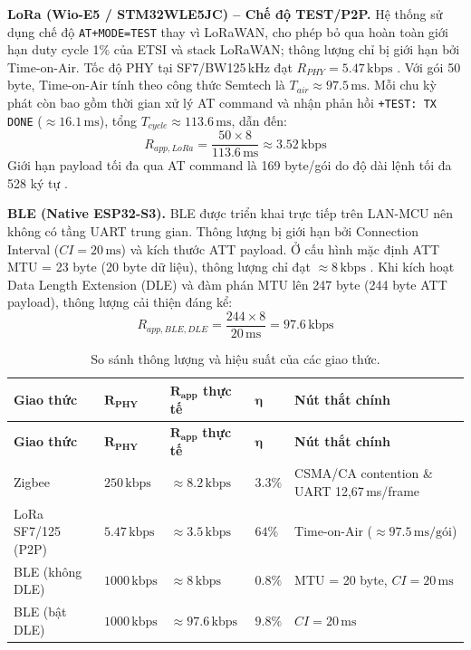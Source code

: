         \textbf{LoRa (Wio-E5 / STM32WLE5JC) -- Chế độ TEST/P2P.} Hệ thống sử dụng chế độ \texttt{AT+MODE=TEST} thay vì LoRaWAN, cho phép bỏ qua hoàn toàn giới hạn duty cycle 1\% của ETSI và stack LoRaWAN; thông lượng chỉ bị giới hạn bởi Time-on-Air. Tốc độ PHY tại SF7/BW125\,kHz đạt $R_{PHY} = 5{.}47\,\text{kbps}$ \cite{semtech_lora_design_guide}. Với gói 50 byte, Time-on-Air tính theo công thức Semtech là $T_{air} \approx 97{.}5\,\text{ms}$. Mỗi chu kỳ phát còn bao gồm thời gian xử lý AT command và nhận phản hồi \texttt{+TEST: TX DONE} ($\approx 16{.}1\,\text{ms}$), tổng $T_{cycle} \approx 113{.}6\,\text{ms}$, dẫn đến:
        \[ R_{app,LoRa} = \dfrac{50 \times 8}{113{.}6\,\text{ms}} \approx 3{.}52\,\text{kbps} \]
        Giới hạn payload tối đa qua AT command là 169 byte/gói do độ dài lệnh tối đa 528 ký tự \cite{seeed_wioe5_at_cmd}.
        
        \textbf{BLE (Native ESP32-S3).} BLE được triển khai trực tiếp trên LAN-MCU nên không có tầng UART trung gian. Thông lượng bị giới hạn bởi Connection Interval ($CI = 20\,\text{ms}$) và kích thước ATT payload. Ở cấu hình mặc định ATT MTU = 23 byte (20 byte dữ liệu), thông lượng chỉ đạt $\approx 8\,\text{kbps}$ \cite{bluetooth_core_v5}. Khi kích hoạt Data Length Extension (DLE) và đàm phán MTU lên 247 byte (244 byte ATT payload), thông lượng cải thiện đáng kể:
        \[ R_{app,BLE,DLE} = \dfrac{244 \times 8}{20\,\text{ms}} = 97{.}6\,\text{kbps} \]
        

        
        \begin{longtable}{|p{3.2cm}|p{2.3cm}|p{2.7cm}|p{1.4cm}|p{4.2cm}|}
            \caption{So sánh thông lượng và hiệu suất của các giao thức.} \label{tab:throughput_efficiency} \\
            \hline
            \textbf{Giao thức} & $\boldsymbol{R_{PHY}}$ & $\boldsymbol{R_{app}}$ \textbf{thực tế} & $\boldsymbol{\eta}$ & \textbf{Nút thắt chính} \\ \hline
            \endfirsthead
            \hline
            \textbf{Giao thức} & $\boldsymbol{R_{PHY}}$ & $\boldsymbol{R_{app}}$ \textbf{thực tế} & $\boldsymbol{\eta}$ & \textbf{Nút thắt chính} \\ \hline
            \endhead
            \hline
            \endfoot
            \endlastfoot
            Zigbee & $250\,\text{kbps}$ & $\approx 8{.}2\,\text{kbps}$ & $3{.}3\%$ & CSMA/CA contention \& UART 12,67\,ms/frame \\ \hline
            LoRa SF7/125 (P2P) & $5{.}47\,\text{kbps}$ & $\approx 3{.}5\,\text{kbps}$ & $64\%$ & Time-on-Air ($\approx 97{.}5\,\text{ms/gói}$) \\ \hline
            BLE (không DLE) & $1000\,\text{kbps}$ & $\approx 8\,\text{kbps}$ & $0{.}8\%$ & MTU = 20 byte, $CI = 20\,\text{ms}$ \\ \hline
            BLE (bật DLE) & $1000\,\text{kbps}$ & $\approx 97{.}6\,\text{kbps}$ & $9{.}8\%$ & $CI = 20\,\text{ms}$ \\ \hline
        \end{longtable}
        

